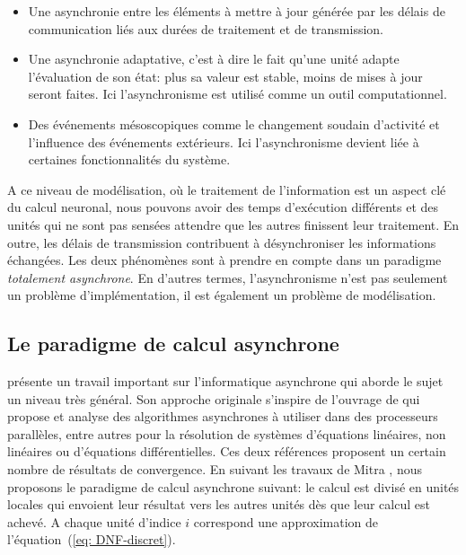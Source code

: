 \begin {itemize}
\item Une asynchronie entre les éléments à mettre à jour générée par les délais de communication liés aux durées de traitement et de transmission.\\

\item Une asynchronie adaptative, c'est à dire le fait qu'une unité adapte l'évaluation de son état: plus sa valeur est stable, moins de mises à jour seront faites. Ici l'asynchronisme est utilisé comme un outil computationnel.\\

\item Des événements mésoscopiques comme le changement soudain d'activité et l'influence des événements extérieurs. Ici l'asynchronisme devient liée à certaines fonctionnalités du système.\\
\end {itemize}

A ce niveau de modélisation, où le traitement de l'information est un aspect clé du calcul neuronal, nous pouvons avoir des temps d'exécution différents et des unités qui ne sont pas sensées attendre que les autres finissent leur traitement. En outre, les délais de transmission contribuent à désynchroniser les informations échangées. Les deux phénomènes sont à prendre en compte dans un paradigme \textit{totalement asynchrone}. En d'autres termes, l'asynchronisme n'est pas seulement un problème d'implémentation, il est également un problème de modélisation.\\

\subsection{Le paradigme de calcul asynchrone}\label{paradigme}

\cite {Mitra:1987} présente un travail important sur l'informatique asynchrone qui aborde le sujet un niveau très général. Son approche originale s'inspire de l'ouvrage de \cite{Chazan:1969} qui propose et analyse des algorithmes asynchrones à utiliser dans des processeurs parallèles, entre autres pour la résolution de systèmes d'équations linéaires, non linéaires ou d'équations différentielles. Ces deux références proposent un certain nombre de résultats de convergence. En suivant les travaux de Mitra \cite{Mitra:1987}, nous proposons le paradigme de calcul asynchrone suivant: le calcul est divisé en unités locales qui envoient leur résultat vers les autres unités dès que leur calcul est achevé. A chaque unité d'indice $i$ correspond une approximation de l'équation~(\ref{eq: DNF-discret}).\\

